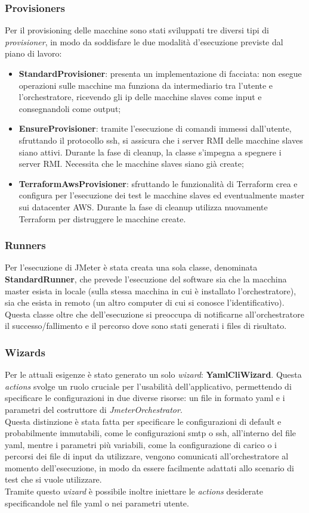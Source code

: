 \subsubsection{Provisioners}
Per il provisioning delle macchine sono stati sviluppati tre diversi tipi di \textit{provisioner}, in modo da soddisfare le due modalità d'esecuzione previste dal piano di lavoro:
\begin{itemize}
	\item \textbf{StandardProvisioner}: presenta un implementazione di facciata: non esegue operazioni sulle macchine ma funziona da intermediario tra l'utente e l'orchestratore, ricevendo gli ip delle macchine slaves come input e consegnandoli come output;
	\item \textbf{EnsureProvisioner}: tramite l'esecuzione di comandi immessi dall'utente, sfruttando il protocollo \gls{ssh}, si assicura che i server RMI delle macchine slaves siano attivi. Durante la fase di cleanup, la classe s'impegna a spegnere i server RMI. Necessita che le macchine slaves siano già create;
	\item \textbf{TerraformAwsProvisioner}: sfruttando le funzionalità di Terraform crea e configura per l'esecuzione dei test le macchine slaves ed eventualmente master sui \gls{datacenter} AWS. Durante la fase di cleanup utilizza nuovamente Terraform per distruggere le macchine create.
\end{itemize}
\subsubsection{Runners}
Per l'esecuzione di JMeter è stata creata una sola classe, denominata \textbf{StandardRunner}, che prevede l'esecuzione del software sia che la macchina master esista in locale (sulla stessa macchina in cui è installato l'orchestratore), sia che esista in remoto (un altro computer di cui si conosce l'identificativo). Questa classe oltre che dell'esecuzione si preoccupa di notificarne all'orchestratore il successo/fallimento e il percorso dove sono stati generati i files di risultato.
\subsubsection{Wizards}
Per le attuali esigenze è stato generato un solo \textit{wizard}: \textbf{YamlCliWizard}. Questa \textit{actions} svolge un ruolo cruciale per l'usabilità dell'applicativo, permettendo di specificare le configurazioni in due diverse risorse: un file in formato \gls{yaml} e i parametri del costruttore di \textit{JmeterOrchestrator}. \\
Questa distinzione è stata fatta per specificare le configurazioni di default e probabilmente immutabili, come le configurazioni \gls{smtp} o \gls{ssh}, all'interno del file \gls{yaml}, mentre i parametri più variabili, come la configurazione di carico o i percorsi dei file di input da utilizzare, vengono comunicati all'orchestratore al momento dell'esecuzione, in modo da essere facilmente adattati allo scenario di test che si vuole utilizzare. \\
Tramite questo \textit{wizard} è possibile inoltre iniettare le \textit{actions} desiderate specificandole nel file \gls{yaml} o nei parametri utente.